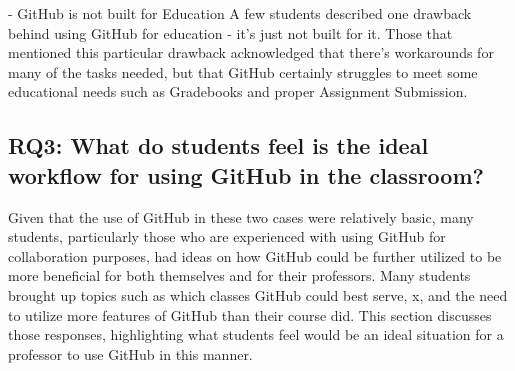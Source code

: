 
- GitHub is not built for Education
A few students described one drawback behind using GitHub for education - it's just not built for it. Those that mentioned this particular drawback acknowledged that there's workarounds for many of the tasks needed, but that GitHub certainly struggles to meet some educational needs such as Gradebooks and proper Assignment Submission. %






\subsection{RQ3: What do students feel is the ideal workflow for using GitHub in the classroom?}

Given that the use of GitHub in these two cases were relatively basic, many students, particularly those who are experienced with using GitHub for collaboration purposes, had ideas on how GitHub could be further utilized to be more beneficial for both themselves and for their professors. Many students brought up topics such as which classes GitHub could best serve, x, and the need to utilize more features of GitHub than their course did. This section discusses those responses, highlighting what students feel would be an ideal situation for a professor to use GitHub in this manner.

